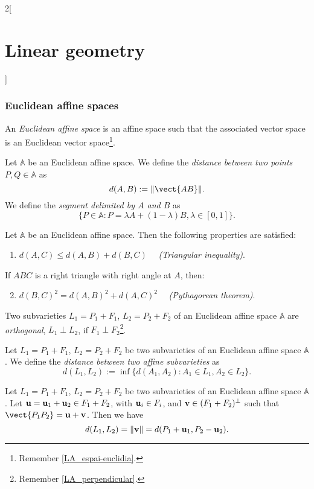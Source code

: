 \documentclass[../../../main.tex]{subfiles}
\begin{document}
\begin{multicols}{2}[\section{Linear geometry}]
    \subsubsection{Euclidean affine spaces}
    \begin{definition}
        An \textit{Euclidean affine space} is an affine space such that the associated vector space is an Euclidean vector space\footnote{Remember \cref{LA_espai-euclidia}.}.
    \end{definition}
    \begin{definition}
        Let $\mathbb{A}$ be an Euclidean affine space. We define the \textit{distance between two points $P,Q\in\mathbb{A}$} as $$d(A,B):=\|\vect{AB}\|.$$ We define the \textit{segment delimited by $A$ and $B$} as $$\{P\in\mathbb{A}:P=\lambda A+(1-\lambda)B,\lambda\in[0,1]\}.$$
    \end{definition}
    \begin{prop}
        Let $\mathbb{A}$ be an Euclidean affine space. Then the following properties are satisfied:
        \begin{enumerate}
            \item $d(A,C)\leq d(A,B)+d(B,C)\quad$ \textit{(Triangular inequality)}.
        \end{enumerate}
        If $ABC$ is a right triangle with right angle at $A$, then:
        \begin{enumerate}
            \setcounter{enumi}{1}
            \item $d(B,C)^2=d(A,B)^2+d(A,C)^2\quad$ \textit{(Pythagorean theorem)}.
        \end{enumerate}
    \end{prop}
    \begin{definition}
        Two subvarieties $L_1=P_1+F_1$, $L_2=P_2+F_2$ of an Euclidean affine space $\mathbb{A}$ are \textit{orthogonal}, $L_1\perp L_2$, if $F_1\perp F_2$\footnote{Remember \cref{LA_perpendicular}.}.
    \end{definition}
    \begin{definition}
        Let $L_1=P_1+F_1$, $L_2=P_2+F_2$ be two subvarieties of an Euclidean affine space $\mathbb{A}$. We define the \textit{distance between two affine subvarieties} as $$d(L_1,L_2):=\inf\{d(A_1,A_2):A_1\in L_1, A_2\in L_2\}.$$
    \end{definition}
    \begin{theorem}
        Let $L_1=P_1+F_1$, $L_2=P_2+F_2$ be two subvarieties of an Euclidean affine space $\mathbb{A}$. Let $\boldsymbol{\mathrm{u}}=\boldsymbol{\mathrm{u}}_1+\boldsymbol{\mathrm{u}}_2\in F_1+F_2$, with $\boldsymbol{\mathrm{u}}_i\in F_i$, and $\boldsymbol{\mathrm{v}}\in(F_1+F_2)^\perp$ such that $\vect{P_1P_2}=\vf{u}+\vf{v}$. Then we have $$d(L_1,L_2)=\|\boldsymbol{\mathrm{v}}\|=d(P_1+\boldsymbol{\mathrm{u}}_1,P_2-\boldsymbol{\mathrm{u}}_2).$$
    \end{theorem}

\end{multicols}
\end{document}
